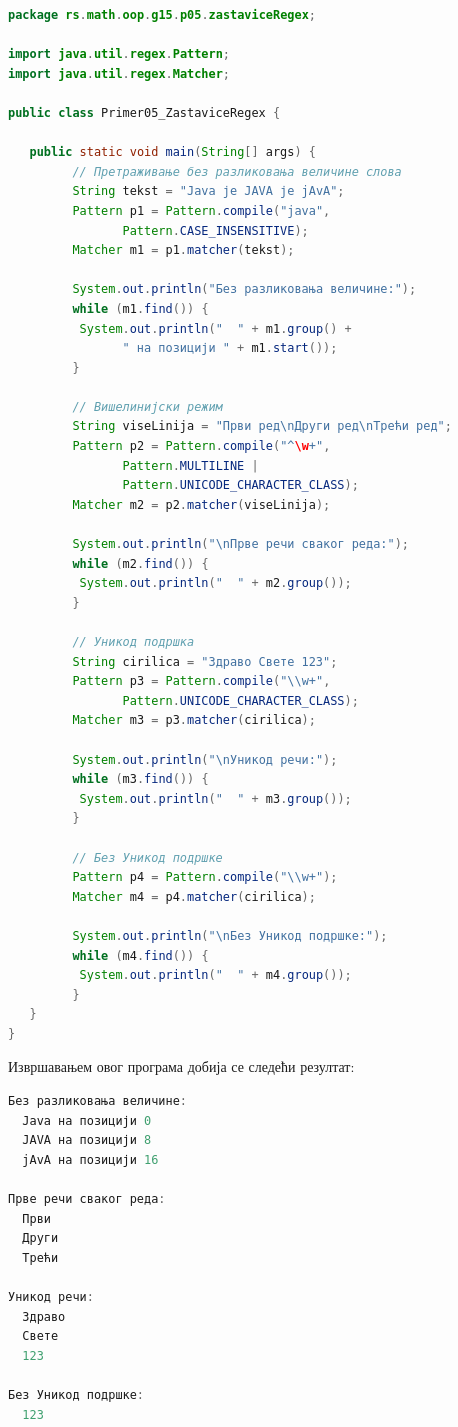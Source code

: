 \begin{lstlisting}[language=Java]
package rs.math.oop.g15.p05.zastaviceRegex;
 
import java.util.regex.Pattern;
import java.util.regex.Matcher;
 
public class Primer05_ZastaviceRegex {
 
   public static void main(String[] args) {
         // Претраживање без разликовања величине слова
         String tekst = "Java је JAVA је jAvA";
         Pattern p1 = Pattern.compile("java",
                Pattern.CASE_INSENSITIVE);
         Matcher m1 = p1.matcher(tekst);
 
         System.out.println("Без разликовања величине:");
         while (m1.find()) {
          System.out.println("  " + m1.group() +
                " на позицији " + m1.start());
         }
 
         // Вишелинијски режим
         String viseLinija = "Први ред\nДруги ред\nТрећи ред";
         Pattern p2 = Pattern.compile("^\w+",
                Pattern.MULTILINE |
                Pattern.UNICODE_CHARACTER_CLASS);
         Matcher m2 = p2.matcher(viseLinija);
 
         System.out.println("\nПрве речи сваког реда:");
         while (m2.find()) {
          System.out.println("  " + m2.group());
         }
 
         // Уникод подршка
         String cirilica = "Здраво Свете 123";
         Pattern p3 = Pattern.compile("\\w+",
                Pattern.UNICODE_CHARACTER_CLASS);
         Matcher m3 = p3.matcher(cirilica);
 
         System.out.println("\nУникод речи:");
         while (m3.find()) {
          System.out.println("  " + m3.group());
         }
 
         // Без Уникод подршке
         Pattern p4 = Pattern.compile("\\w+");
         Matcher m4 = p4.matcher(cirilica);
 
         System.out.println("\nБез Уникод подршке:");
         while (m4.find()) {
          System.out.println("  " + m4.group());
         }
   }
}
\end{lstlisting}


Извршавањем овог програма добија се следећи резултат:


\begin{lstlisting}[language=Java]
Без разликовања величине:
  Java на позицији 0
  JAVA на позицији 8
  jAvA на позицији 16
 
Прве речи сваког реда:
  Први
  Други
  Трећи
 
Уникод речи:
  Здраво
  Свете
  123
 
Без Уникод подршке:
  123
\end{lstlisting}


